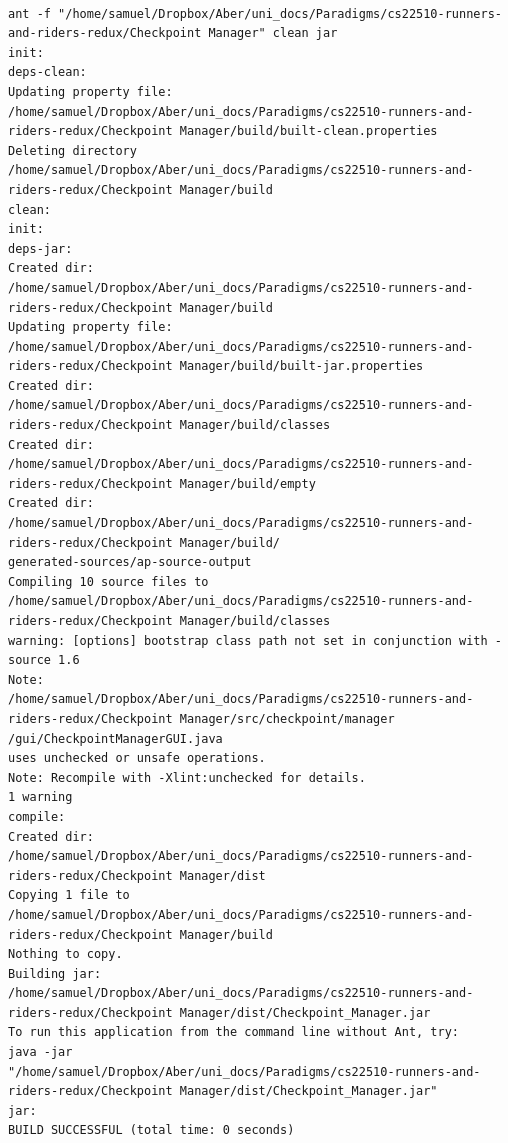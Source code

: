 \documentclass{article}
\begin{document}
\begin{center}
	\begin{lstlisting}[showstringspaces=false, caption={Build log of the C Event Manager Program}]
	
ant -f "/home/samuel/Dropbox/Aber/uni_docs/Paradigms/cs22510-runners-and-riders-redux/Checkpoint Manager" clean jar
init:
deps-clean:
Updating property file: 
/home/samuel/Dropbox/Aber/uni_docs/Paradigms/cs22510-runners-and-riders-redux/Checkpoint Manager/build/built-clean.properties
Deleting directory 
/home/samuel/Dropbox/Aber/uni_docs/Paradigms/cs22510-runners-and-riders-redux/Checkpoint Manager/build
clean:
init:
deps-jar:
Created dir: 
/home/samuel/Dropbox/Aber/uni_docs/Paradigms/cs22510-runners-and-riders-redux/Checkpoint Manager/build
Updating property file: 
/home/samuel/Dropbox/Aber/uni_docs/Paradigms/cs22510-runners-and-riders-redux/Checkpoint Manager/build/built-jar.properties
Created dir: 
/home/samuel/Dropbox/Aber/uni_docs/Paradigms/cs22510-runners-and-riders-redux/Checkpoint Manager/build/classes
Created dir: 
/home/samuel/Dropbox/Aber/uni_docs/Paradigms/cs22510-runners-and-riders-redux/Checkpoint Manager/build/empty
Created dir: 
/home/samuel/Dropbox/Aber/uni_docs/Paradigms/cs22510-runners-and-riders-redux/Checkpoint Manager/build/
generated-sources/ap-source-output
Compiling 10 source files to 
/home/samuel/Dropbox/Aber/uni_docs/Paradigms/cs22510-runners-and-riders-redux/Checkpoint Manager/build/classes
warning: [options] bootstrap class path not set in conjunction with -source 1.6
Note: 
/home/samuel/Dropbox/Aber/uni_docs/Paradigms/cs22510-runners-and-riders-redux/Checkpoint Manager/src/checkpoint/manager
/gui/CheckpointManagerGUI.java 
uses unchecked or unsafe operations.
Note: Recompile with -Xlint:unchecked for details.
1 warning
compile:
Created dir: 
/home/samuel/Dropbox/Aber/uni_docs/Paradigms/cs22510-runners-and-riders-redux/Checkpoint Manager/dist
Copying 1 file to /home/samuel/Dropbox/Aber/uni_docs/Paradigms/cs22510-runners-and-riders-redux/Checkpoint Manager/build
Nothing to copy.
Building jar: 
/home/samuel/Dropbox/Aber/uni_docs/Paradigms/cs22510-runners-and-riders-redux/Checkpoint Manager/dist/Checkpoint_Manager.jar
To run this application from the command line without Ant, try:
java -jar 
"/home/samuel/Dropbox/Aber/uni_docs/Paradigms/cs22510-runners-and-riders-redux/Checkpoint Manager/dist/Checkpoint_Manager.jar"
jar:
BUILD SUCCESSFUL (total time: 0 seconds)

		
	\end{lstlisting}
\end{center}
\end{document}

